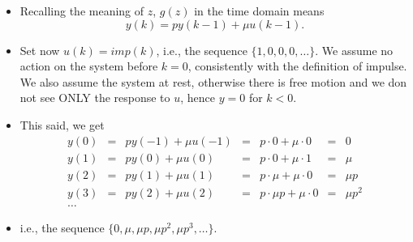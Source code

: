 \begin{frame}
\myPause
 \begin{itemize}[<+-| alert@+>]
 \item Recalling the meaning of $z$, $g(z)$ in the time domain means
       \begin{displaymath}
        y(k) = p y(k-1) + \mu u(k-1).
       \end{displaymath}
 \item Set now $u(k)=imp(k)$, i.e., the sequence $\{1,0,0,0,\ldots\}$. We assume no action on the system
       before $k=0$, consistently with the definition of impulse. We also assume the system at rest, otherwise
       there is free motion and we don not see ONLY the response to $u$, hence $y=0$ for $k<0$.
 \item This said, we get
       {\small
       \begin{displaymath}
        \begin{array}{lclclclclcl}
         y(0) &=& p y(-1) + \mu u(-1) &=& p \cdot 0     + \mu \cdot 0 &=& 0       \\
         y(1) &=& p y(0)  + \mu u(0)  &=& p \cdot 0     + \mu \cdot 1 &=& \mu     \\
         y(2) &=& p y(1)  + \mu u(1)  &=& p \cdot \mu   + \mu \cdot 0 &=& \mu p   \\
         y(3) &=& p y(2)  + \mu u(2)  &=& p \cdot \mu p + \mu \cdot 0 &=& \mu p^2 \\
         \ldots
        \end{array}
       \end{displaymath}
       }
 \item \vspace{-4mm}i.e., the sequence $\{0,\mu,\mu p,\mu p^2,\mu p^3,\ldots\}$.
 \end{itemize}
\end{frame}


